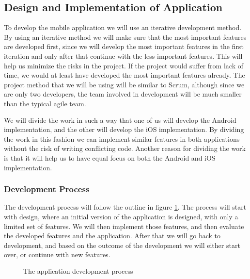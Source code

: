 \documentclass[12pt, a4paper, onecolumn]{article}
\begin{document}
	\subsection{Design and Implementation of Application}
	
	To develop the mobile application we will use an iterative development method. By using an iterative method we will make sure that the most important features are developed first, since we will develop the most important features in the first iteration and only after that continue with the less important features. This will help us  minimize the risks in the project. If the project would suffer from lack of time, we would at least have developed the most important features already. The project method that we will be using will be similar to Scrum, although since we are only two developers, the team involved in development will be much smaller than the typical agile team.
	
	We will divide the work in such a way that one of us will develop the Android implementation, and the other will develop the iOS implementation. By dividing the work in this fashion we can implement similar features in both applications without the risk of writing conflicting code. Another reason for dividing the work is that it will help us to have equal focus on both the Android and iOS implementation.
	
	\subsubsection{Development Process}
	
	The development process will follow the outline in figure \ref{fig:development}. The process will start with design, where an initial version of the application is designed, with only a limited set of features. We will then implement those features, and then evaluate the developed features and the application. After that we will go back to development, and based on the outcome of the development we will either start over, or continue with new features.
	
	\begin{figure}[H]
		\centering
		\caption{The application development process}%
		\label{fig:development}%
	\end{figure}
	
\end{document}

